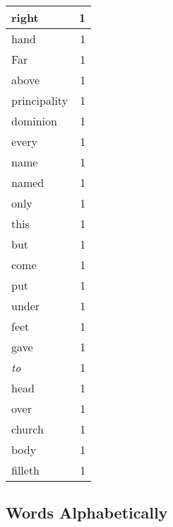\begin{center}
\begin{longtable}{l|r}
right & 1\\ \hline 
hand & 1\\ \hline 
Far & 1\\ \hline 
above & 1\\ \hline 
principality & 1\\ \hline 
dominion & 1\\ \hline 
every & 1\\ \hline 
name & 1\\ \hline 
named & 1\\ \hline 
only & 1\\ \hline 
this & 1\\ \hline 
but & 1\\ \hline 
come & 1\\ \hline 
put & 1\\ \hline 
under & 1\\ \hline 
feet & 1\\ \hline 
gave & 1\\ \hline 
\emph{to} & 1\\ \hline 
head & 1\\ \hline 
over & 1\\ \hline 
church & 1\\ \hline 
body & 1\\ \hline 
filleth & 1\\ \hline 
\end{longtable}  
\end{center}  


  
\normalsize  

  
  


\subsection{Words Alphabetically}

